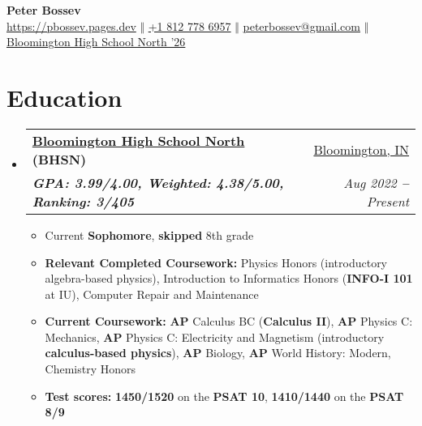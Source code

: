 \documentclass[letterpaper,9pt]{article}
\makeatletter
\newcommand{\cvSubItem}[1]{
  \item\small{
    {#1 \vspace{-2pt}}
  }
}
\newcommand{\cvFour}[4]{
  \vspace{-2pt}\item
    \begin{tabular*}{1\textwidth}[t]{l@{\extracolsep{\fill}}r}
      \textbf{#1} & #2 \\
      \textit{\small#3} & \textit{\small #4} \\
    \end{tabular*}\vspace{-5pt}
}
\newcommand{\cvBodyStart}{\begin{itemize}[leftmargin=0.15in, label={}]}
\newcommand{\cvBodyEnd}{\end{itemize}}
\newcommand{\cvListStart}{\begin{itemize}}
\newcommand{\cvListEnd}{\end{itemize}\vspace{-5pt}}
\makeatother
\begin{document}
\begin{center}
	\textbf{{\huge \color{black} Peter Bossev}}\\ \vspace{10pt}
    \small
    \faLink \hspace{.5pt} \href{https://pbossev.pages.dev}
    {https://pbossev.pages.dev}
    \large $\Vert$ \small
    \faMobile \hspace{.5pt} \href{tel:18127786957}
    {+1 812 778 6957}
    \large $\Vert$ \small
    \faAt \hspace{.5pt} \href{mailto:peterbossev@gmail.com}
    {peterbossev@gmail.com}
    \large $\Vert$ \small
    \faGlobe \hspace{.5pt}
    \href{https://north.mccsc.edu/}{Bloomington High School North '26}
\end{center}

\section{Education}
\cvBodyStart
    \cvFour{\href{https://north.mccsc.edu/}{Bloomington High School North} (BHSN)}{\href{https://www.google.com/maps/place/Bloomington,+IN}{Bloomington, IN}}
      {\textbf{GPA: 3.99/4.00, Weighted: 4.38/5.00, Ranking: 3/405}}{Aug 2022 \textbf{--} Present}
       \cvListStart
             \cvSubItem{Current \textbf{Sophomore}, \textbf{skipped} 8th grade}
             \cvSubItem{\textbf{Relevant Completed Coursework:} Physics Honors (introductory algebra-based physics), Introduction to Informatics Honors (\textbf{INFO-I 101} at IU), Computer Repair and Maintenance}
             \cvSubItem{\textbf{Current Coursework:} \textbf{AP} Calculus BC (\textbf{Calculus II}), \textbf{AP} Physics C: Mechanics, \textbf{AP} Physics C: Electricity and Magnetism (introductory \textbf{calculus-based physics}), \textbf{AP} Biology, \textbf{AP} World History: Modern, Chemistry Honors}
             \cvSubItem{\textbf{Test scores:} \textbf{1450/1520} on the \textbf{PSAT 10}, \textbf{1410/1440} on the \textbf{PSAT 8/9}}
        \cvListEnd
\cvBodyEnd
\end{document}
